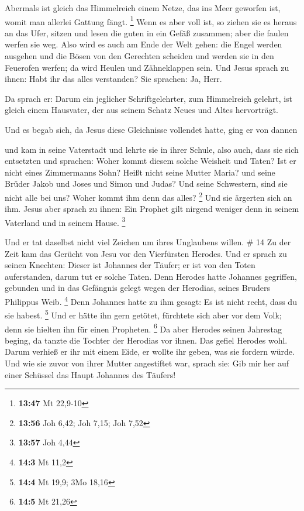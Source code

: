  Abermals ist gleich das Himmelreich einem Netze, das ins
Meer geworfen ist, womit man allerlei Gattung fängt. \footnote{\textbf{13:47}
  Mt 22,9-10}  Wenn es aber voll ist, so ziehen sie es
heraus an das Ufer, sitzen und lesen die guten in ein Gefäß zusammen;
aber die faulen werfen sie weg.  Also wird es auch am Ende
der Welt gehen: die Engel werden ausgehen und die Bösen von den
Gerechten scheiden  und werden sie in den Feuerofen werfen;
da wird Heulen und Zähneklappen sein.  Und Jesus sprach zu
ihnen: Habt ihr das alles verstanden? Sie sprachen: Ja, Herr.

 Da sprach er: Darum ein jeglicher Schriftgelehrter, zum
Himmelreich gelehrt, ist gleich einem Hausvater, der aus seinem Schatz
Neues und Altes hervorträgt.

 Und es begab sich, da Jesus diese Gleichnisse vollendet
hatte, ging er von dannen

 und kam in seine Vaterstadt und lehrte sie in ihrer
Schule, also auch, dass sie sich entsetzten und sprachen: Woher kommt
diesem solche Weisheit und Taten?  Ist er nicht eines
Zimmermanns Sohn? Heißt nicht seine Mutter Maria? und seine Brüder Jakob
und Joses und Simon und Judas?  Und seine Schwestern, sind
sie nicht alle bei uns? Woher kommt ihm denn das alles? \footnote{\textbf{13:56}
  Joh 6,42; Joh 7,15; Joh 7,52}  Und sie ärgerten sich an
ihm. Jesus aber sprach zu ihnen: Ein Prophet gilt nirgend weniger denn
in seinem Vaterland und in seinem Hause. \footnote{\textbf{13:57} Joh
  4,44}

 Und er tat daselbst nicht viel Zeichen um ihres Unglaubens
willen. \# 14  Zu der Zeit kam das Gerücht von Jesu vor den
Vierfürsten Herodes.  Und er sprach zu seinen Knechten:
Dieser ist Johannes der Täufer; er ist von den Toten auferstanden, darum
tut er solche Taten.  Denn Herodes hatte Johannes gegriffen,
gebunden und in das Gefängnis gelegt wegen der Herodias, seines Bruders
Philippus Weib. \footnote{\textbf{14:3} Mt 11,2}  Denn
Johannes hatte zu ihm gesagt: Es ist nicht recht, dass du sie habest.
\footnote{\textbf{14:4} Mt 19,9; 3Mo 18,16}  Und er hätte
ihn gern getötet, fürchtete sich aber vor dem Volk; denn sie hielten ihn
für einen Propheten. \footnote{\textbf{14:5} Mt 21,26}  Da
aber Herodes seinen Jahrestag beging, da tanzte die Tochter der Herodias
vor ihnen. Das gefiel Herodes wohl.  Darum verhieß er ihr
mit einem Eide, er wollte ihr geben, was sie fordern würde. 
Und wie sie zuvor von ihrer Mutter angestiftet war, sprach sie: Gib mir
her auf einer Schüssel das Haupt Johannes des Täufers!

